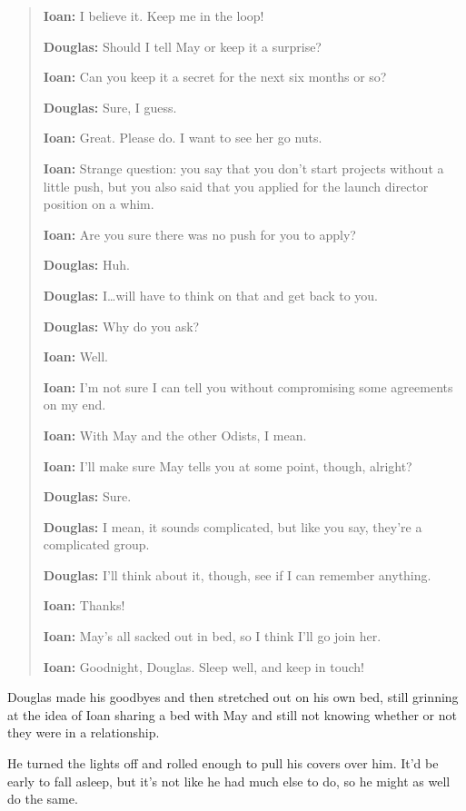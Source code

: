 \begin{quote}
\textbf{Ioan:} I believe it. Keep me in the loop!

\textbf{Douglas:} Should I tell May or keep it a surprise?

\textbf{Ioan:} Can you keep it a secret for the next six months or so?

\textbf{Douglas:} Sure, I guess.

\textbf{Ioan:} Great. Please do. I want to see her go nuts.

\textbf{Ioan:} Strange question: you say that you don't start projects without a little push, but you also said that you applied for the launch director position on a whim.

\textbf{Ioan:} Are you sure there was no push for you to apply?

\textbf{Douglas:} Huh.

\textbf{Douglas:} I\ldots will have to think on that and get back to you.

\textbf{Douglas:} Why do you ask?

\textbf{Ioan:} Well.

\textbf{Ioan:} I'm not sure I can tell you without compromising some agreements on my end.

\textbf{Ioan:} With May and the other Odists, I mean.

\textbf{Ioan:} I'll make sure May tells you at some point, though, alright?

\textbf{Douglas:} Sure.

\textbf{Douglas:} I mean, it sounds complicated, but like you say, they're a complicated group.

\textbf{Douglas:} I'll think about it, though, see if I can remember anything.

\textbf{Ioan:} Thanks!

\textbf{Ioan:} May's all sacked out in bed, so I think I'll go join her.

\textbf{Ioan:} Goodnight, Douglas. Sleep well, and keep in touch!
\end{quote}

\noindent Douglas made his goodbyes and then stretched out on his own bed, still grinning at the idea of Ioan sharing a bed with May and still not knowing whether or not they were in a relationship.

He turned the lights off and rolled enough to pull his covers over him. It'd be early to fall asleep, but it's not like he had much else to do, so he might as well do the same.
